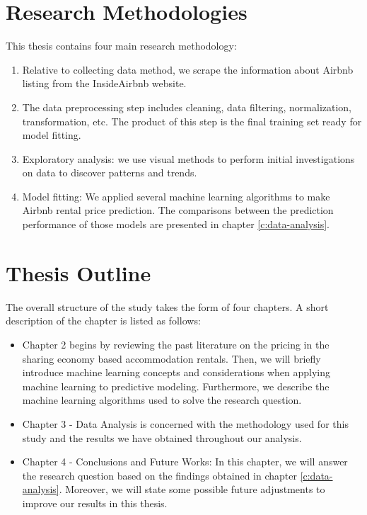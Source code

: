 \section{Research Methodologies}
This thesis contains four main research methodology:
\begin{enumerate}
\item Relative to collecting data method, we scrape the information about Airbnb
  listing from the InsideAirbnb website.
\item The data preprocessing step includes cleaning, data filtering,
  normalization, transformation, etc. The product of this step is the final
  training set ready for model fitting.
\item Exploratory analysis: we use visual methods to perform initial
  investigations on data to discover patterns and trends.
\item Model fitting:
  We applied several machine learning algorithms to make Airbnb rental price
  prediction.  The comparisons between the prediction performance of those
  models are presented in chapter \ref{c:data-analysis}.
\end{enumerate}

\section{Thesis Outline}
The overall structure of the study takes the form of four chapters. A short
description of the chapter is listed as follows:

\begin{itemize}

\item Chapter 2 begins by reviewing the past literature on the pricing in the
  sharing economy based accommodation rentals. Then, we will briefly introduce
  machine learning concepts and considerations when applying machine learning to
  predictive modeling. Furthermore,  we describe the machine learning algorithms
  used to solve the research question.

\item Chapter 3 - Data Analysis is concerned with the methodology used for this
study and the results we have obtained throughout our analysis.

\item Chapter 4 - Conclusions and Future Works: In this chapter, we will answer
  the research question based on the findings obtained in chapter
  \ref{c:data-analysis}.  Moreover, we will state some possible future
  adjustments to improve our results in this thesis.
\end{itemize}


